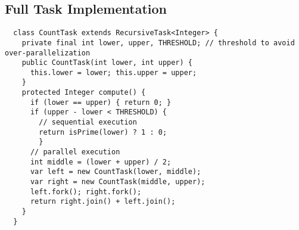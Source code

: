 \subsection*{Full Task Implementation}
\begin{lstlisting}
  class CountTask extends RecursiveTask<Integer> {
    private final int lower, upper, THRESHOLD; // threshold to avoid over-parallelization
    public CountTask(int lower, int upper) {
      this.lower = lower; this.upper = upper;
    }
    protected Integer compute() {
      if (lower == upper) { return 0; }
      if (upper - lower < THRESHOLD) { 
        // sequential execution
        return isPrime(lower) ? 1 : 0; 
        }
      // parallel execution
      int middle = (lower + upper) / 2;
      var left = new CountTask(lower, middle);
      var right = new CountTask(middle, upper);
      left.fork(); right.fork();
      return right.join() + left.join();
    }
  }
\end{lstlisting}